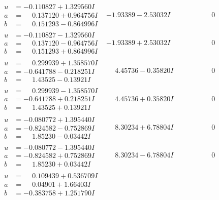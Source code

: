 \documentclass[1p]{elsarticle_modified}
\theoremstyle{definition}
\begin{document}
$$\begin{array}{c|c|c}
\begin{aligned}
u &= -0.110827 + 1.329560 I \\
a &= \phantom{-}0.137120 + 0.964756 I \\
b &= \phantom{-}0.151293 - 0.864996 I\end{aligned}
 & -1.93389 - 2.53032 I & \phantom{-0.000000 } 0 \\ \hline\begin{aligned}
u &= -0.110827 - 1.329560 I \\
a &= \phantom{-}0.137120 - 0.964756 I \\
b &= \phantom{-}0.151293 + 0.864996 I\end{aligned}
 & -1.93389 + 2.53032 I & \phantom{-0.000000 } 0 \\ \hline\begin{aligned}
u &= \phantom{-}0.299939 + 1.358570 I \\
a &= -0.641788 - 0.218251 I \\
b &= \phantom{-}1.43525 - 0.13921 I\end{aligned}
 & \phantom{-}4.45736 - 0.35820 I & \phantom{-0.000000 } 0 \\ \hline\begin{aligned}
u &= \phantom{-}0.299939 - 1.358570 I \\
a &= -0.641788 + 0.218251 I \\
b &= \phantom{-}1.43525 + 0.13921 I\end{aligned}
 & \phantom{-}4.45736 + 0.35820 I & \phantom{-0.000000 } 0 \\ \hline\begin{aligned}
u &= -0.080772 + 1.395440 I \\
a &= -0.824582 - 0.752869 I \\
b &= \phantom{-}1.85230 - 0.03442 I\end{aligned}
 & \phantom{-}8.30234 + 6.78804 I & \phantom{-0.000000 } 0 \\ \hline\begin{aligned}
u &= -0.080772 - 1.395440 I \\
a &= -0.824582 + 0.752869 I \\
b &= \phantom{-}1.85230 + 0.03442 I\end{aligned}
 & \phantom{-}8.30234 - 6.78804 I & \phantom{-0.000000 } 0 \\ \hline\begin{aligned}
u &= \phantom{-}0.109439 + 0.536709 I \\
a &= \phantom{-}0.04901 + 1.66403 I \\
b &= -0.383758 + 1.251790 I\end{aligned}

\end{array}$$
\end{document}
